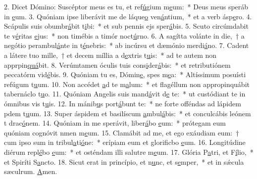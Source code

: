 2. Dicet Dómino: Suscéptor meus es tu, et ref\uline{ú}gium m\uline{e}um:~* Deus meus speráb in \uline{e}um.
3. Quóniam ipse liberávit me de láque\uline{o} ven\uline{á}ntium,~* et a verb ásp\uline{e}ro.
4. Scápulis suis obumbr\uline{á}bit t\uline{i}bi:~* et sub pennis ejs sper\uline{á}bis.
5. Scuto circúmdabit te v\uline{é}ritas \uline{e}jus:~* non timébis a timór noct\uline{ú}rno.
6. A sagítta volánte in die,~† a negótio perambul\uline{á}nte in t\uline{é}nebris:~* ab incúrsu et dæmónio merdi\uline{á}no.
7. Cadent a látere tuo mille,~† et decem míllia a d\uline{e}xtris t\uline{u}is:~* ad te autem non apprpin\uline{quá}bit.
8. Verúmtamen óculis tuis cons\uline{i}der\uline{á}bis:~* et retributiónem peccatórm vid\uline{é}bis.
9. Quóniam tu es, Dómin\uline{e}, spes m\uline{e}a:~* Altíssimum posuísti refúgum t\uline{u}um.
10. Non accédet \uline{a}d te m\uline{a}lum:~* et flagéllum non appropinquábit tabernáclo t\uline{u}o.
11. Quóniam Angelis suis mand\uline{á}vit d\uline{e} te:~* ut custódiant te in ómnibus vis t\uline{u}is.
12. In mánib\uline{u}s port\uline{á}bunt te:~* ne forte offéndas ad lápidem pdem t\uline{u}um.
13. Super áspidem et basilíscum \uline{a}mbul\uline{á}bis:~* et conculcábis leónem t drac\uline{ó}nem.
14. Quóniam in me sperávit, liber\uline{á}bo \uline{e}um:~* prótegam eum quóniam cognóvit nmen m\uline{e}um.
15. Clamábit ad me, et ego exáudiam eum:~† cum ipso sum in tribul\uline{a}ti\uline{ó}ne:~* erípiam eum et glorificbo \uline{e}um.
16. Longitúdine diérum repl\uline{é}bo \uline{e}um:~* et osténdam illi salutre m\uline{e}um.
17. Glória P\uline{a}tri, et F\uline{í}lio,~* et Spiríti S\uline{a}ncto.
18. Sicut erat in princípio, et n\uline{u}nc, et s\uline{e}mper,~* et in sǽcula sæculrum. \uline{A}men.
